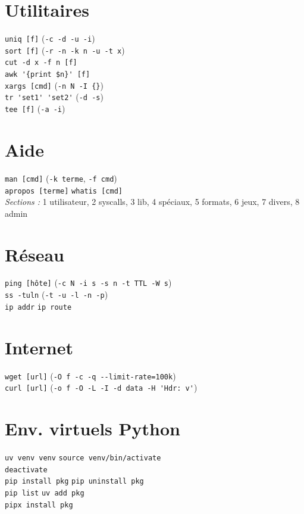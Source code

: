 \documentclass[10pt]{article}
\begin{document}
\begin{multicols}{4}
\section*{Utilitaires}
\lstinline|uniq [f]| (\lstinline|-c -d -u -i|) \\
\lstinline|sort [f]| (\lstinline|-r -n -k n -u -t x|) \\
\lstinline|cut -d x -f n [f]| \\
\lstinline|awk '{print $n}' [f]| \\
\lstinline|xargs [cmd]| (\lstinline|-n N -I {}|) \\
\lstinline|tr 'set1' 'set2'| (\lstinline|-d -s|) \\
\lstinline|tee [f]| (\lstinline|-a -i|) \\

\section*{Aide}
\lstinline|man [cmd]| (\lstinline|-k terme|, \lstinline|-f cmd|) \\
\lstinline|apropos [terme]| \quad \lstinline|whatis [cmd]| \\
\textit{Sections :} 1 utilisateur, 2 syscalls, 3 lib, 4 spéciaux, 5 formats, 6 jeux, 7 divers, 8 admin \\

\section*{Réseau}
\lstinline|ping [hôte]| (\lstinline|-c N -i s -s n -t TTL -W s|) \\
\lstinline|ss -tuln| (\lstinline|-t -u -l -n -p|) \\
\lstinline|ip addr| \quad \lstinline|ip route| \\

\section*{Internet}
\lstinline|wget [url]| (\lstinline|-O f -c -q --limit-rate=100k|) \\
\lstinline|curl [url]| (\lstinline|-o f -O -L -I -d data -H 'Hdr: v'|) \\

\section*{Env. virtuels Python}
\lstinline|uv venv venv| \quad \lstinline|source venv/bin/activate| \\
\lstinline|deactivate| \\
\lstinline|pip install pkg| \quad \lstinline|pip uninstall pkg| \\
\lstinline|pip list| \quad \lstinline|uv add pkg| \\
\lstinline|pipx install pkg| \\


\end{multicols}
\end{document}

